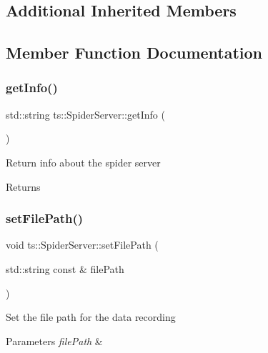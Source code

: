 \subsection*{Additional Inherited Members}


\subsection{Member Function Documentation}
\mbox{\label{classts_1_1_spider_server_ac5b16b49dfd465073e0cb235b1812b6e}} 
\subsubsection{\texorpdfstring{get\+Info()}{getInfo()}}
{\footnotesize\ttfamily std\+::string ts\+::\+Spider\+Server\+::get\+Info (\begin{DoxyParamCaption}{ }\end{DoxyParamCaption})}

Return info about the spider server \begin{DoxyReturn}{Returns}

\end{DoxyReturn}
\mbox{\label{classts_1_1_spider_server_a747cb40f25dd9c9d0f6819d27647904e}} 
\subsubsection{\texorpdfstring{set\+File\+Path()}{setFilePath()}}
{\footnotesize\ttfamily void ts\+::\+Spider\+Server\+::set\+File\+Path (\begin{DoxyParamCaption}\item[{std\+::string const \&}]{file\+Path }\end{DoxyParamCaption})}

Set the file path for the data recording 
\begin{DoxyParams}{Parameters}
{\em file\+Path} & \\
\hline
\end{DoxyParams}
\mbox{\label{classts_1_1_spider_server_a241af3e9ae7a627184b37a4b657c4ef1}} 
